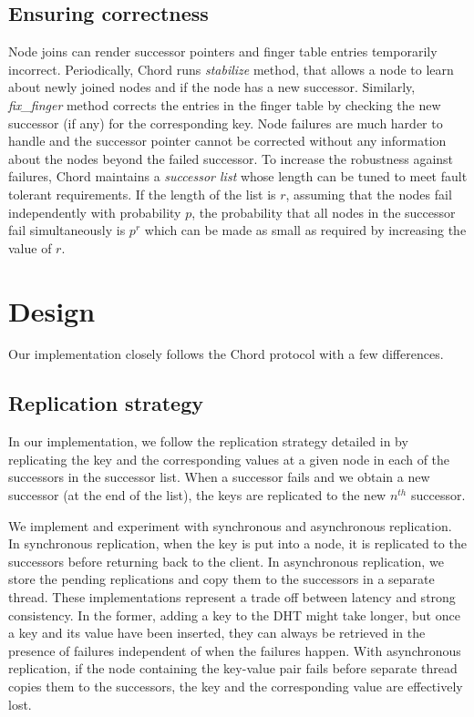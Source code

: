 \documentclass{sig-alternate-10pt}
\begin{document}
\subsection{Ensuring correctness}
Node joins can render successor pointers and finger table entries temporarily incorrect. Periodically, Chord runs \textit{stabilize} method, that allows a node to learn about newly joined nodes and if the node has a new successor. Similarly, \textit{fix\_finger} method corrects the entries in the finger table by checking the new successor (if any) for the corresponding key. Node failures are much harder to handle and the successor pointer cannot be corrected without any information about the nodes beyond the failed successor. To increase the robustness against failures, Chord maintains a \textit{successor list} whose length can be tuned to meet fault tolerant requirements. If the length of the list is $r$, assuming that the nodes fail independently with probability $p$, the probability that all nodes in the successor fail simultaneously is $p^r$ which can be made as small as required by increasing the value of $r$.

\section{Design}
Our implementation closely follows the Chord protocol with a few differences. 

\subsection{Replication strategy}
In our implementation, we follow the replication strategy detailed in \cite{dynamo} by replicating the key and the corresponding values at a given node in each of the successors in the successor list. When a successor fails and we obtain a new successor (at the end of the list), the keys are replicated to the new $n^{th}$ successor.

We implement and experiment with synchronous and asynchronous replication. In synchronous replication, when the key is put into a node, it is replicated to the successors before returning back to the client. In asynchronous replication, we store the pending replications and copy them to the successors in a separate thread. These implementations represent a trade off between latency and strong consistency. In the former, adding a key to the DHT might take longer, but once a key and its value have been inserted, they can always be retrieved in the presence of failures independent of when the failures happen. With asynchronous replication, if the node containing the key-value pair fails before separate thread copies them to the successors, the key and the corresponding value are effectively lost.
\end{document}
